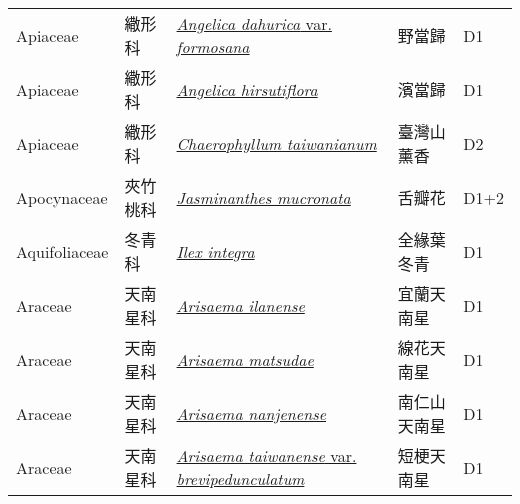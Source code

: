 {\begin{longtable}{p{2.5cm}p{2cm}p{5cm}p{2.5cm}p{3cm}}
    Apiaceae & 繖形科 & \href{http://www.theplantlist.org/tpl1.1/search?q=Angelica+dahurica+var.+formosana}{\textit{Angelica dahurica} var. \textit{formosana} } & 野當歸 & D1 \index{Angelica@\textit{Angelica}!dahurica@\textit{dahurica}!var. formosana@var. \textit{formosana}}  \index{野當歸} \\
    Apiaceae & 繖形科 & \href{http://www.theplantlist.org/tpl1.1/search?q=Angelica+hirsutiflora}{\textit{Angelica hirsutiflora} } & 濱當歸 & D1 \index{Angelica@\textit{Angelica}!hirsutiflora@\textit{hirsutiflora}}  \index{濱當歸} \\
    Apiaceae & 繖形科 & \href{http://www.theplantlist.org/tpl1.1/search?q=Chaerophyllum+taiwanianum}{\textit{Chaerophyllum taiwanianum} } & 臺灣山薰香 & D2 \index{Chaerophyllum@\textit{Chaerophyllum}!taiwanianum@\textit{taiwanianum}}  \index{臺灣山薰香} \\
    Apocynaceae & 夾竹桃科 & \href{http://www.theplantlist.org/tpl1.1/search?q=Jasminanthes+mucronata}{\textit{Jasminanthes mucronata} } & 舌瓣花 & D1+2 \index{Jasminanthes@\textit{Jasminanthes}!mucronata@\textit{mucronata}}  \index{舌瓣花} \\
    Aquifoliaceae & 冬青科 & \href{http://www.theplantlist.org/tpl1.1/search?q=Ilex+integra}{\textit{Ilex integra} } & 全緣葉冬青 & D1 \index{Ilex@\textit{Ilex}!integra@\textit{integra}}  \index{全緣葉冬青} \\
    Araceae & 天南星科 & \href{http://www.theplantlist.org/tpl1.1/search?q=Arisaema+ilanense}{\textit{Arisaema ilanense} } & 宜蘭天南星 & D1 \index{Arisaema@\textit{Arisaema}!ilanense@\textit{ilanense}}  \index{宜蘭天南星} \\
    Araceae & 天南星科 & \href{http://www.theplantlist.org/tpl1.1/search?q=Arisaema+matsudae}{\textit{Arisaema matsudae} } & 線花天南星 & D1 \index{Arisaema@\textit{Arisaema}!matsudae@\textit{matsudae}}  \index{線花天南星} \\
    Araceae & 天南星科 & \href{http://www.theplantlist.org/tpl1.1/search?q=Arisaema+nanjenense}{\textit{Arisaema nanjenense} } & 南仁山天南星 & D1 \index{Arisaema@\textit{Arisaema}!nanjenense@\textit{nanjenense}}  \index{南仁山天南星} \\
    Araceae & 天南星科 & \href{http://www.theplantlist.org/tpl1.1/search?q=Arisaema+taiwanense+var.+brevipedunculatum}{\textit{Arisaema taiwanense} var. \textit{brevipedunculatum} } & 短梗天南星 & D1 \index{Arisaema@\textit{Arisaema}!taiwanense@\textit{taiwanense}!var. brevipedunculatum@var. \textit{brevipedunculatum}}  \index{短梗天南星} \\

\end{longtable}}
